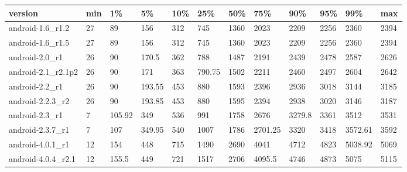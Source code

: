 \documentclass[a4paper]{article}
\begin{document}
\begin{tabular}{|l|l|l|l|l|l|l|l|l|l|l|l|}
\hline
version&min&1\%&5\%&10\%&25\%&50\%&75\%&90\%&95\%&99\%&max\\
\hline
android-1.6\_r1.2&27&89&156&312&745&1360&2023&2209&2256&2360&2394\\
\hline
android-1.6\_r1.5&27&89&156&312&745&1360&2023&2209&2256&2360&2394\\
\hline
android-2.0\_r1&26&90&170.5&362&788&1487&2191&2439&2478&2587&2626\\
\hline
android-2.1\_r2.1p2&26&90&171&363&790.75&1502&2211&2460&2497&2604&2642\\
\hline
android-2.2\_r1&26&90&193.55&453&880&1593&2396&2936&3018&3144&3185\\
\hline
android-2.2.3\_r2&26&90&193.85&453&880&1595&2394&2938&3020&3146&3187\\
\hline
android-2.3\_r1&7&105.92&349&536&991&1758&2676&3279.8&3361&3512&3531\\
\hline
android-2.3.7\_r1&7&107&349.95&540&1007&1786&2701.25&3320&3418&3572.61&3592\\
\hline
android-4.0.1\_r1&12&154&448&715&1490&2690&4041&4712&4823&5038.92&5069\\
\hline
android-4.0.4\_r2.1&12&155.5&449&721&1517&2706&4095.5&4746&4873&5075&5115\\
\hline
\end{tabular}
\end{document}
